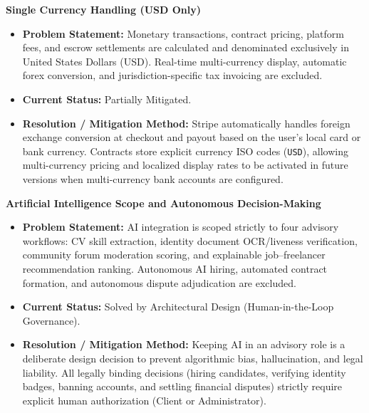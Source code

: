 \begin{description}[leftmargin=2.0cm,labelwidth=1.8cm,align=left,font=\normalfont\bfseries]
\item[LI-04] \textbf{Single Currency Handling (USD Only)}
\begin{itemize}[leftmargin=0.5cm, label=--]
\item \textbf{Problem Statement:} Monetary transactions, contract pricing, platform fees, and escrow settlements are calculated and denominated exclusively in United States Dollars (USD). Real-time multi-currency display, automatic forex conversion, and jurisdiction-specific tax invoicing are excluded.
\item \textbf{Current Status:} Partially Mitigated.
\item \textbf{Resolution / Mitigation Method:} Stripe automatically handles foreign exchange conversion at checkout and payout based on the user's local card or bank currency. Contracts store explicit currency ISO codes (\texttt{USD}), allowing multi-currency pricing and localized display rates to be activated in future versions when multi-currency bank accounts are configured.
\end{itemize}

\item[LI-05] \textbf{Artificial Intelligence Scope and Autonomous Decision-Making}
\begin{itemize}[leftmargin=0.5cm, label=--]
\item \textbf{Problem Statement:} AI integration is scoped strictly to four advisory workflows: CV skill extraction, identity document OCR/liveness verification, community forum moderation scoring, and explainable job--freelancer recommendation ranking. Autonomous AI hiring, automated contract formation, and autonomous dispute adjudication are excluded.
\item \textbf{Current Status:} Solved by Architectural Design (Human-in-the-Loop Governance).
\item \textbf{Resolution / Mitigation Method:} Keeping AI in an advisory role is a deliberate design decision to prevent algorithmic bias, hallucination, and legal liability. All legally binding decisions (hiring candidates, verifying identity badges, banning accounts, and settling financial disputes) strictly require explicit human authorization (Client or Administrator).
\end{itemize}


\end{description}

